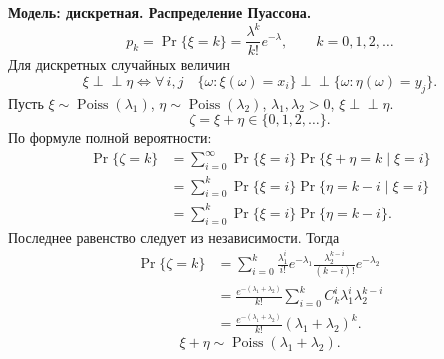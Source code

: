 \begin{solution}
    \textbf{Модель: дискретная. Распределение Пуассона.}
    \[
        p_k=\Pr\{\xi=k\}=\frac{\lambda^k}{k!}e^{-\lambda},
        \qquad k=0,1,2,\ldots
    \]
    Для дискретных случайных величин
    \[
        \xi\perp\!\!\!\perp\eta
        \iff\forall\,i,j\quad
        \{\omega:\xi(\omega)=x_i\}\perp\!\!\!\perp
        \{\omega:\eta(\omega)=y_j\}.
    \]
    Пусть $\xi\sim\operatorname{Poiss}(\lambda_1)$,
    $\eta\sim\operatorname{Poiss}(\lambda_2)$,
    $\lambda_1,\lambda_2>0$, $\xi\perp\!\!\!\perp\eta$.
    \[
        \zeta=\xi+\eta\in\{0,1,2,\ldots\}.
    \]
    По формуле полной вероятности:
    \[
        \begin{aligned}
            \Pr\{\zeta=k\}
            &=\sum_{i=0}^{\infty}\Pr\{\xi=i\}
                \Pr\{\xi+\eta=k\mid\xi=i\}\\
            &=\sum_{i=0}^{k}\Pr\{\xi=i\}
                \Pr\{\eta=k-i\mid\xi=i\}\\
            &=\sum_{i=0}^{k}\Pr\{\xi=i\}\Pr\{\eta=k-i\}.
        \end{aligned}
    \]
    Последнее равенство следует из независимости. Тогда
    \[
        \begin{aligned}
            \Pr\{\zeta=k\}
            &=\sum_{i=0}^{k}\frac{\lambda_1^i}{i!}e^{-\lambda_1}
                \frac{\lambda_2^{k-i}}{(k-i)!}e^{-\lambda_2}\\
            &=\frac{e^{-(\lambda_1+\lambda_2)}}{k!}
                \sum_{i=0}^{k}C_k^i\lambda_1^i\lambda_2^{k-i}\\
            &=\frac{e^{-(\lambda_1+\lambda_2)}}{k!}
                (\lambda_1+\lambda_2)^k.
        \end{aligned}
    \]
    \[
        \boxed{\xi+\eta\sim\operatorname{Poiss}(\lambda_1+\lambda_2)}.
    \]
\end{solution}

